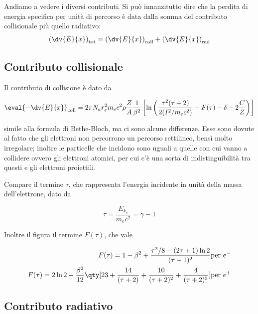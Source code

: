 \vspace{0.2cm}Andiamo a vedere i diversi contributi. Si può innanzitutto dire che la perdita di energia specifica per unità di percorso è data dalla somma del contributo collisionale più quello radiativo:
\begin{equation*}
    \left(\dv{E}{x}\right)_{\rm tot}
    =\left(\dv{E}{x}\right)_{\rm coll} + \left(\dv{E}{x}\right)_{\rm rad}
\end{equation*}

\subsection{Contributo collisionale}

Il contributo di collisione è dato da

\begin{equation*}
    \eval{-\dv{E}{x}}_{\rm coll}
    =2 \pi N_a r_e^2 m_e c^2 \rho \frac{Z}{A} \frac{1}{\beta^2} \left[\ln{\left(\frac{\tau^2 (\tau + 2)}{2(I^2/m_e c^2)} + F(\tau) - \delta - 2 \frac{C}{Z}\right)}\right]
\end{equation*}

\E simile alla formula di Bethe-Bloch, ma ci sono alcune differenze. Esse sono dovute al fatto che gli elettroni non percorrono un percorso rettilineo, bensì molto irregolare; inoltre le particelle che incidono sono uguali a quelle con cui vanno a collidere ovvero gli elettroni atomici, per cui c'è una sorta di indistinguibilità tra questi e gli elettroni proiettili.

Compare il termine $\tau$, che rappresenta l'energia incidente in unità della massa dell'elettrone, dato da

\begin{equation*}
    \tau=\frac{E_{k_e}}{m_e c^2}=\gamma - 1
\end{equation*}

Inoltre il figura il termine $F(\tau)$, che vale

\begin{eqnarray*}
    F(\tau)=1 - \beta^2 + \frac{\tau^2/8 - (2\tau + 1)\ln{2}}{(\tau + 1)^2} & \text{per } e^-
    \\
    F(\tau)=2\ln{2} - \frac{\beta^2}{12} \qty[ 23 + \frac{14}{(\tau + 2)} + \frac{10}{(\tau + 2)^2} + \frac{4}{(\tau + 2)^3} ] & \text{per } e^+
\end{eqnarray*}

\subsection{Contributo radiativo}

